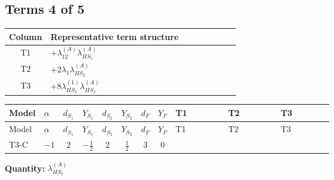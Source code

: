 \documentclass[8pt]{article}
\begin{document}
\begin{landscape}
\subsection*{Terms 4 of 5}
\begin{center}
\begin{tabular}{@{}c >{\raggedright\arraybackslash}p{0.82\linewidth}@{}}
\toprule
Column & Representative term structure \\
\midrule
T1 & \(\displaystyle +{\lambda_{12}^{(A)}} {\lambda_{HS_1}^{(A)}}\) \\
\midrule
T2 & \(\displaystyle +2 {\lambda_1} {\lambda_{HS_2}^{(A)}}\) \\
\midrule
T3 & \(\displaystyle +8 {\lambda_{HS_2}^{(1)}} {\lambda_{HS_2}^{(A)}}\) \\
\midrule
\bottomrule
\end{tabular}
\end{center}
\smallskip
\tiny
\begin{longtable}{@{}llcccccc >{\raggedright\arraybackslash}p{0.21\linewidth} >{\raggedright\arraybackslash}p{0.21\linewidth} >{\raggedright\arraybackslash}p{0.21\linewidth}@{}}
\toprule
Model & $\alpha$ & $d_{S_1}$ & $Y_{S_1}$ & $d_{S_2}$ & $Y_{S_2}$ & $d_F$ & $Y_F$ & T1 & T2 & T3 \\
\midrule
\endfirsthead
\toprule
Model & $\alpha$ & $d_{S_1}$ & $Y_{S_1}$ & $d_{S_2}$ & $Y_{S_2}$ & $d_F$ & $Y_F$ & T1 & T2 & T3 \\
\midrule
\endhead
T3-C & $-1$ & $2$ & $-\frac{1}{2}$ & $2$ & $\frac{1}{2}$ & $3$ & $0$ & \scriptsize\adjustbox{max width=\linewidth}{$\begin{gathered} +{\lambda_{12}^{(A)}} {\lambda_{HS_1}^{(A)}}\end{gathered}$} & \scriptsize\adjustbox{max width=\linewidth}{$\begin{gathered} +2 {\lambda_1} {\lambda_{HS_2}^{(A)}}\end{gathered}$} & \scriptsize\adjustbox{max width=\linewidth}{$\begin{gathered} +8 {\lambda_{HS_2}^{(1)}} {\lambda_{HS_2}^{(A)}}\end{gathered}$} \\
\midrule
\bottomrule
\end{longtable}
\clearpage
\noindent\textbf{Quantity: }$\lambda_{HS_2}^{(A)}$\par\smallskip

\end{landscape}
\end{document}
